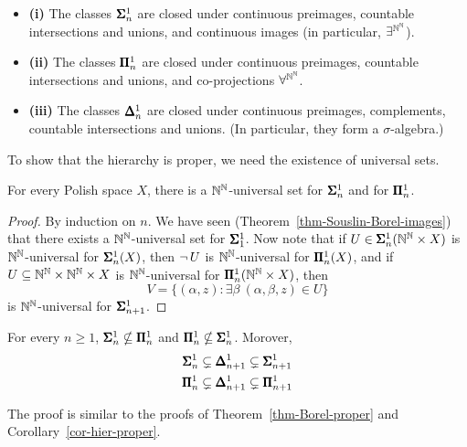 \begin{proposition}\label{prop-closure-projective}\begin{itemize}
\item \textbf{(i)} The classes $\pmb{\Sigma}^{1}_{n}$ are closed under continuous preimages, countable intersections and unions, and continuous images (in particular, $\exists^{\mathbb{N}^{\mathbb{N}}}$).


\item \textbf{(ii)} The classes $\pmb{\Pi}^1_{n}$ are closed under continuous preimages, countable intersections and unions, and co-projections $\forall^{\mathbb{N}^{\mathbb{N}}}$.


\item \textbf{(iii)} The classes $\pmb{\Delta}^1_n$ are closed under continuous preimages, complements, countable intersections and unions. (In particular, they form a $\sigma$-algebra.)
\end{itemize}

\end{proposition}To show that the hierarchy is proper, we need the existence of universal sets.

\begin{proposition}\label{prop-universal-projective}For every Polish space $X$, there is a $\mathbb{N}^{\mathbb{N}}$-universal set for $\pmb{\Sigma}^{1}_{n}$ and for $\pmb{\Pi}^1_{n}$.

\end{proposition}\begin{proof}By induction on $n$. We have seen (Theorem~\ref{thm-Souslin-Borel-images}) that there exists a $\mathbb{N}^{\mathbb{N}}$-universal set for $\pmb{\Sigma}^{1}_{1}$. Now note that if $U \in \pmb{\Sigma}^{1}_{n}(\mathbb{N}^{\mathbb{N}}\times X)$ is $\mathbb{N}^{\mathbb{N}}$-universal for $\pmb{\Sigma}^{1}_{n}(X)$, then $\neg \, U$ is $\mathbb{N}^{\mathbb{N}}$-universal for $\pmb{\Pi}^1_{n}(X)$, and if $U \subseteq \mathbb{N}^{\mathbb{N}} \times \mathbb{N}^{\mathbb{N}} \times X$ is $\mathbb{N}^{\mathbb{N}}$-universal for $\pmb{\Pi}^1_{n}(\mathbb{N}^{\mathbb{N}} \times X)$, then
\begin{equation*}
V = \{(\alpha,z) \colon \exists \beta \: (\alpha,\beta,z) \in U \}
\end{equation*}
is $\mathbb{N}^{\mathbb{N}}$-universal for $\pmb{\Sigma}^{1}_{n+1}$.

\end{proof}\begin{corollary}\label{cor-projective-proper}For every $n \geq 1$, $\pmb{\Sigma}^{1}_{n} \nsubseteq \pmb{\Pi}^1_{n}$ and $\pmb{\Pi}^1_{n} \nsubseteq \pmb{\Sigma}^{1}_{n}$. Morover,
\begin{gather*}
	\pmb{\Sigma}^{1}_{n} \subsetneq \pmb{\Delta}^1_{n+1} \subsetneq \pmb{\Sigma}^{1}_{n+1} \\
	\pmb{\Pi}^1_{n} \subsetneq \pmb{\Delta}^1_{n+1} \subsetneq \pmb{\Pi}^1_{n+1} \\		
\end{gather*}
\end{corollary}The proof is similar to the proofs of Theorem~\ref{thm-Borel-proper} and Corollary~\ref{cor-hier-proper}.

